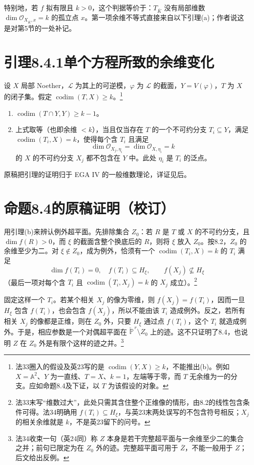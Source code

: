 \documentclass[openany,fontset=fandol]{ctexbook}
\DeclareMathOperator{\codim}{codim}
\newcommand{\PP}{\mathbb P}
\newcommand{\OO}{\mathcal O}
\begin{document}
特别地，若 $f$ 拟有限且 $k>0$，这个判据等价于：$T_{\overline K}$ 没有局部维数 $\dim\OO_{X_{\overline K},x}=k$ 的孤立点 $x$。第一项余维不等式直接来自以下引理(a)；作者说这是对第5节的一处补记。

\newpage
\section*{引理8.4.1\quad 单个方程所致的余维变化}
设 $X$ 局部 Noether，$\mathcal L$ 为其上的可逆模，$\varphi$ 为 $\mathcal L$ 的截面，$Y=V(\varphi)$，$T$ 为 $X$ 的闭子集。假定 $\codim(T,X)\ge k$。\footnote{法33圈入的假设及英23写的是 $\codim(Y,X)\ge k$，不能推出(b)。例如 $X=\mathbb A^2$、$Y$ 为一直线、$T=X$、$k=1$，左端等于零，而 $T$ 无余维为一的分支。应如命题8.4及下证，以 $T$ 为该假设的对象。}
\begin{enumerate}
\renewcommand{\labelenumi}{\alph{enumi})}
\item $\codim(T\cap Y,Y)\ge k-1$。
\item 上式取等（也即余维 $<k$），当且仅当存在 $T$ 的一个不可约分支 $T_i\subseteq Y$，满足 $\codim(T_i,X)=k$，使得每个含 $T_i$ 且满足
\[
 \dim\OO_{X_j,\eta_i}=\dim\OO_{X,\eta_i}=k
\]
的 $X$ 的不可约分支 $X_j$ 都不包含在 $Y$ 中。此处 $\eta_i$ 是 $T_i$ 的泛点。
\end{enumerate}
原稿把引理的证明归于 EGA IV 的一般维数理论，详证见后。

\section*{命题8.4的原稿证明（校订）}
用引理(b)来辨认例外超平面。先排除集合 $Z_0$：若 $R$ 是 $T$ 或 $X$ 的不可约分支，且 $\dim f(R)>0$，而 $\xi$ 的截面含整个换底后的 $R$，则将 $\xi$ 放入 $Z_0$。按8.2，$Z_0$ 的余维至少为二。对 $\xi\notin Z_0$，成为例外，恰须有一个 $\codim(T_i,X)=k$ 的 $T_i$ 满足
\[
 \dim f(T_i)=0,\quad f(T_i)\subseteq H_\xi,\qquad
 f(X_j)\not\subseteq H_\xi
\]
（最后一项对每个含 $T_i$ 且 $\codim(T_i,X_j)=k$ 的 $X_j$ 成立）。\footnote{法33末写“维数过大”，此处只需其含住整个正维像的情形，由8.2的线性包含条件可得。法34明确用 $f(T_i)\subseteq H_\xi$，与英23末两处误写的不包含符号相反；$X_j$ 的相关余维就是 $k$，不是英23留下的问号。}

固定这样一个 $T_i$。若某个相关 $X_j$ 的像为零维，则 $f(X_j)=f(T_i)$，因而一旦 $H_\xi$ 包含 $f(T_i)$，也会包含 $f(X_j)$，所以不能由该 $T_i$ 造成例外。反之，若所有相关 $X_j$ 的像都是正维，则在 $Z_0$ 外，只要 $H_\xi$ 通过点 $f(T_i)$，这个 $T_i$ 就造成例外。于是，相应参数是一个对偶超平面在 $\check{\PP}^{\,r}\setminus Z_0$ 上的迹。这不只证明了8.4，也说明 $Z$ 在 $Z_0$ 外是有限个这样的迹之并。\footnote{法34收束一句（英24同）称 $Z$ 本身是若干完整超平面与一余维至少二的集合之并；前句已限定为在 $Z_0$ 外的迹。完整超平面可用于 $\overline Z$，不能一般用于 $Z$；后文给出反例。}
\end{document}
